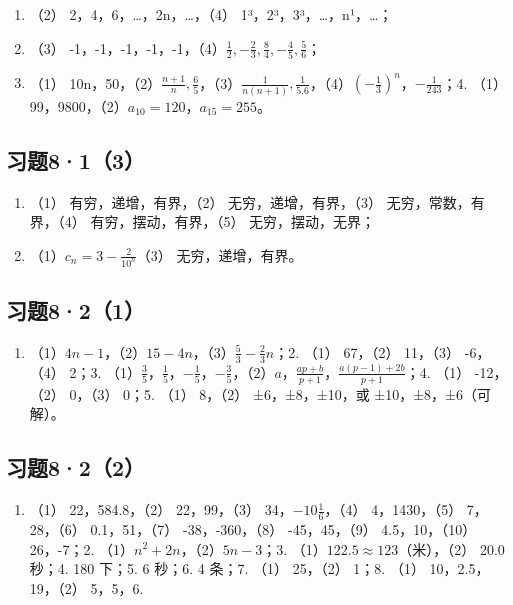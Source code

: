 \begin{enumerate}
\item
  （2） 2，4，6，\ldots，2n，\ldots，（4）
  1³，2³，3³，\ldots，n¹，\ldots；
\item
  （3）
  -1，-1，-1，-1，-1，（4）\(\frac{1}{2}, -\frac{2}{3}, \frac{8}{4}, -\frac{4}{5}, \frac{5}{6}\)；
\item
  （1）
  10n，50，（2）\(\frac{n+1}{n}, \frac{6}{5}\)，（3）\(\frac{1}{n(n+1)}, \frac{1}{5.6}\)，（4）\(\left(-\frac{1}{3}\right)^n\)，\(-\frac{1}{243}\)；4.
  （1） 99，9800，（2）\(a_{10}=120\)，\(a_{15}=255\)。
\end{enumerate}

\subsection{习题8·1（3）}

\begin{enumerate}[start=2]
\item
  （1） 有穷，递增，有界，（2） 无穷，递增，有界，（3）
  无穷，常数，有界，（4） 有穷，摆动，有界，（5） 无穷，摆动，无界；
\item
  （1）\(c_{n} = 3 - \frac{2}{10^{n}}\)（3） 无穷，递增，有界。
\end{enumerate}

\subsection{习题8·2（1）}

\begin{enumerate}
\item
  （1）\(4n - 1\)，（2）\(15 - 4n\)，（3）\(\frac{5}{3} - \frac{2}{3} n\)；2.
  （1） 67，（2） 11，（3） -6，（4） 2；3.
  （1）\(\frac{3}{5}\)，\(\frac{1}{5}\)，\(-\frac{1}{5}\)，\(-\frac{3}{5}\)，（2）\(a\)，\(\frac{ap + b}{p + 1}\)，\(\frac{a(p - 1) + 2b}{p + 1}\)；4.
  （1） -12，（2） 0，（3） 0；5. （1） 8，（2） ±6，±8，±10，或
  ±10，±8，±6（可解）。
\end{enumerate}

\subsection{习题8·2（2）}

\begin{enumerate}
\item
  （1） 22，584.8，（2） 22，99，（3） 34，\(-10\frac{1}{6}\)，（4）
  4，1430，（5） 7，28，（6） 0.1，51，（7） -38，-360，（8）
  -45，45，（9） 4.5，10，（10） 26，-7；2.
  （1）\(n^2 + 2n\)，（2）\(5n - 3\)；3.
  （1）\(122.5 \approx 123\)（米），（2） 20.0 秒；4. 180 下；5. 6
  秒；6. 4 条；7. （1） 25，（2） 1；8. （1） 10，2.5，19，（2）
  5，5，6.
\end{enumerate}

